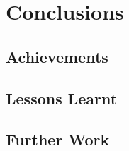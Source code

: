 
    
    \chapter{Conclusions}
    

    \section{Achievements}
    
    \section{Lessons Learnt}

    \section{Further Work}
    
